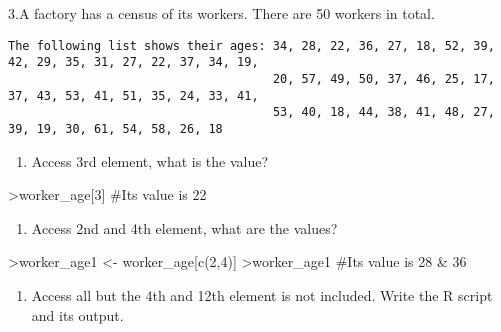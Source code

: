 \documentclass[
]{article}
\newenvironment{Shaded}{\begin{snugshade}}{\end{snugshade}}
\newcommand{\NormalTok}[1]{#1}
\providecommand{\tightlist}{%
  \setlength{\itemsep}{0pt}\setlength{\parskip}{0pt}}
\begin{document}
3.A factory has a census of its workers. There are 50 workers in total.

\begin{verbatim}
The following list shows their ages: 34, 28, 22, 36, 27, 18, 52, 39, 42, 29, 35, 31, 27, 22, 37, 34, 19, 
                                     20, 57, 49, 50, 37, 46, 25, 17, 37, 43, 53, 41, 51, 35, 24, 33, 41, 
                                     53, 40, 18, 44, 38, 41, 48, 27, 39, 19, 30, 61, 54, 58, 26, 18
\end{verbatim}

\begin{enumerate}
\def\labelenumi{\alph{enumi}.}
\tightlist
\item
  Access 3rd element, what is the value?
\end{enumerate}

\begin{Shaded}
\begin{Highlighting}[]
\NormalTok{\textgreater{}worker\_age[3] \#Its value is 22}
\end{Highlighting}
\end{Shaded}

\begin{enumerate}
\def\labelenumi{\alph{enumi}.}
\setcounter{enumi}{1}
\tightlist
\item
  Access 2nd and 4th element, what are the values?
\end{enumerate}

\begin{Shaded}
\begin{Highlighting}[]
\NormalTok{\textgreater{}worker\_age1 \textless{}{-} worker\_age[c(2,4)]}
\NormalTok{\textgreater{}worker\_age1  \#Its value is 28 \& 36 }
\end{Highlighting}
\end{Shaded}

\begin{enumerate}
\def\labelenumi{\alph{enumi}.}
\setcounter{enumi}{2}
\tightlist
\item
  Access all but the 4th and 12th element is not included. Write the R
  script and its output.
\end{enumerate}
\end{document}

